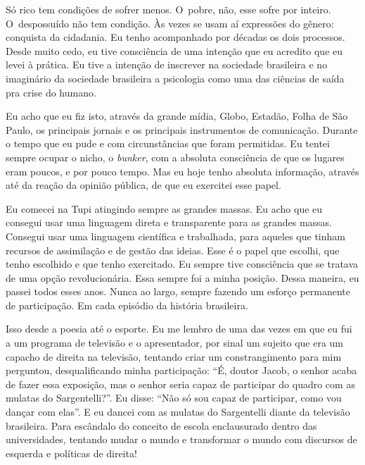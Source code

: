  

Só rico tem condições de sofrer menos. O~pobre, não, esse sofre por
inteiro. O~despossuído não tem condição. Às vezes se usam aí expressões
do gênero: conquista da cidadania. Eu tenho acompanhado por décadas os
dois processos. Desde muito cedo, eu tive consciência de uma intenção
que eu acredito que eu levei à prática. Eu tive a intenção de inscrever
na sociedade brasileira e no imaginário da sociedade brasileira a
psicologia como uma das ciências de saída pra crise do humano.

 

Eu acho que eu fiz isto, através da grande mídia,  Globo, Estadão,
Folha de São Paulo, os principais jornais e os principais instrumentos
de comunicação. Durante o tempo que eu pude e com circunstâncias que
foram permitidas. Eu tentei sempre ocupar o nicho, o \emph{bunker}, com a
absoluta consciência de que os lugares eram poucos, e por pouco tempo.
Mas eu hoje tenho absoluta informação, através até da reação da opinião
pública, de que eu exercitei esse papel.

 

Eu comecei na  Tupi atingindo sempre as grandes massas. Eu acho que eu
consegui usar uma linguagem direta e transparente para as grandes
massas. Consegui usar uma linguagem científica e trabalhada, para
aqueles que tinham recursos de assimilação e de gestão das ideias. Esse
é o papel que escolhi, que tenho escolhido e que tenho exercitado. Eu
sempre tive consciência que se tratava de uma opção revolucionária. Essa
sempre foi a minha posição. Dessa maneira, eu passei todos esses anos.
Nunca ao largo, sempre fazendo um esforço permanente de participação. Em
cada episódio da história brasileira.

Isso desde a poesia até o esporte. Eu me lembro de uma das vezes em que
eu fui a um programa de televisão e o apresentador, por sinal um sujeito
que era um capacho de direita na televisão, tentando criar um
constrangimento para mim perguntou, desqualificando minha participação:
``É, doutor Jacob, o senhor acaba de fazer essa exposição, mas o senhor
seria capaz de participar do quadro com as mulatas do Sargentelli?''. Eu
disse: ``Não só sou capaz de participar, como vou dançar com elas''. E eu
dancei com as mulatas do Sargentelli diante da televisão brasileira.
Para escândalo do conceito de escola enclausurado dentro das
universidades, tentando mudar o mundo e transformar o mundo com
discursos de esquerda e políticas de direita!

